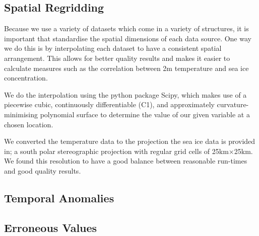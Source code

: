 \documentclass[../main.tex]{subfiles}
\begin{document}
\subsection*{Spatial Regridding}
Because we use a variety of datasets which come in a variety of structures, it is important that standardise the spatial dimensions of each data source. One way we do this is by interpolating each dataset to have a consistent spatial arrangement. This allows for better quality results and makes it easier to calculate measures such as the correlation between 2m temperature and sea ice concentration.

We do the interpolation using the python package Scipy, which makes use of a piecewise cubic, continuously differentiable (C1), and approximately curvature-minimising polynomial surface to determine the value of our given variable at a chosen location. 

We converted the temperature data to the projection the sea ice data is provided in; a south polar stereographic projection with regular grid cells of 25km$\times$25km. We found this resolution to have a good balance between reasonable run-times and good quality results.

\subsection*{Temporal Anomalies}
\subsection*{Erroneous Values}
\end{document}

